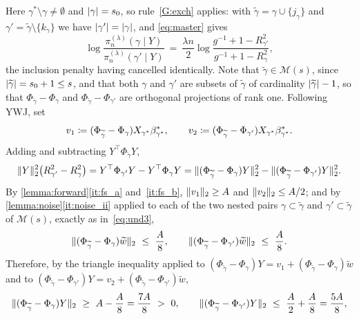Here $\gamma^{\ast}\setminus\gamma\neq\emptyset$ and $\lvert\gamma\rvert=s_0$, so
rule~\ref{G:exch} applies: with
$\widetilde\gamma=\gamma\cup\{j_\gamma\}$ and
$\gamma'=\widetilde\gamma\setminus\{k_\gamma\}$ we have
$\lvert\gamma'\rvert=\lvert\gamma\rvert$, and \eqref{eq:master} gives
\begin{equation}
    \label{eq:sat1}
    \log\frac{\pi_n^{(\lambda)}(\gamma\mid Y)}
    {\pi_n^{(\lambda)}(\gamma'\mid Y)}
    \ =\ \frac{\lambda n}{2}
    \log\frac{g^{-1}+1-R^{2}_{\gamma'}}{g^{-1}+1-R^{2}_{\gamma}} ,
\end{equation}
the inclusion penalty having cancelled identically. Note that
$\widetilde\gamma\in\mathscr{M}(s)$, since
$\lvert\widetilde\gamma\rvert=s_0+1\leq s$, and that both $\gamma$ and $\gamma'$
are subsets of $\widetilde\gamma$ of cardinality
$\lvert\widetilde\gamma\rvert-1$, so that
$\Phi_{\widetilde\gamma}-\Phi_\gamma$ and
$\Phi_{\widetilde\gamma}-\Phi_{\gamma'}$ are orthogonal projections of
rank one. Following YWJ, set
\begin{equation}
    \label{eq:vdef}
    v_1\coloneq(\Phi_{\widetilde\gamma}-\Phi_\gamma)X_{\gamma^{\ast}}\beta^{\ast}_{\gamma^{\ast}},
    \qquad
    v_2\coloneq(\Phi_{\widetilde\gamma}-\Phi_{\gamma'})X_{\gamma^{\ast}}\beta^{\ast}_{\gamma^{\ast}} .
\end{equation}
Adding and subtracting $Y^{\top}\Phi_{\widetilde\gamma}Y$,
\begin{equation}
    \label{eq:sat2}
    \lVert Y\rVert_2^{2}\bigl(R^{2}_{\gamma'}-R^{2}_{\gamma}\bigr)
    =Y^{\top}\Phi_{\gamma'}Y-Y^{\top}\Phi_{\gamma}Y
    =\lVert(\Phi_{\widetilde\gamma}-\Phi_\gamma)Y\rVert_2^{2}
    -\lVert(\Phi_{\widetilde\gamma}-\Phi_{\gamma'})Y\rVert_2^{2} .
\end{equation}
By \cref{lemma:forward}\ref{it:fs_a} and~\ref{it:fs_b},
$\lVert v_1\rVert_2\geq A$ and $\lVert v_2\rVert_2\leq A/2$; and by
\cref{lemma:noise}\ref{it:noise_ii} applied to each of the two nested
pairs $\gamma\subset\widetilde\gamma$ and
$\gamma'\subset\widetilde\gamma$ of $\mathscr{M}(s)$, exactly as
in~\eqref{eq:und3},
\begin{equation}
    \label{eq:sat4}
    \lVert(\Phi_{\widetilde\gamma}-\Phi_\gamma)\widetilde w\rVert_2
    \ \leq\ \frac{A}{8},
    \qquad
    \lVert(\Phi_{\widetilde\gamma}-\Phi_{\gamma'})\widetilde w\rVert_2
    \ \leq\ \frac{A}{8} .
\end{equation}
Therefore, by the triangle inequality applied to
$(\Phi_{\widetilde\gamma}-\Phi_\gamma)Y=v_1
+(\Phi_{\widetilde\gamma}-\Phi_\gamma)\widetilde w$ and to
$(\Phi_{\widetilde\gamma}-\Phi_{\gamma'})Y=v_2
+(\Phi_{\widetilde\gamma}-\Phi_{\gamma'})\widetilde w$,
\begin{equation}
    \label{eq:sat5}
    \lVert(\Phi_{\widetilde\gamma}-\Phi_\gamma)Y\rVert_2
    \ \geq\ A-\frac{A}{8}=\frac{7A}{8}\ >\ 0,
    \qquad
    \lVert(\Phi_{\widetilde\gamma}-\Phi_{\gamma'})Y\rVert_2
    \ \leq\ \frac{A}{2}+\frac{A}{8}=\frac{5A}{8} ,
\end{equation}
